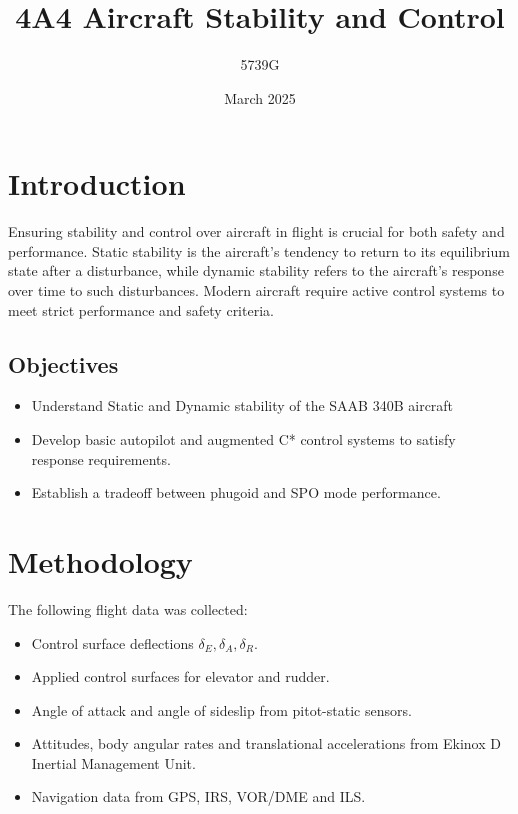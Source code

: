 \documentclass{article}
\begin{document}
\title{4A4 Aircraft Stability and Control}
\author{5739G}
\date{March 2025}
\maketitle

\section{Introduction}

Ensuring stability and control over aircraft in flight is crucial for both safety and performance.
Static stability is the aircraft's tendency to return to its equilibrium state after a disturbance, while dynamic stability refers to the aircraft's response over time to such disturbances.
Modern aircraft require active control systems to meet strict performance and safety criteria.

\subsection{Objectives}

\begin{itemize}
    \item Understand Static and Dynamic stability of the SAAB 340B aircraft
    \item Develop basic autopilot and augmented C* control systems to satisfy response requirements.
    \item Establish a tradeoff between phugoid and SPO mode performance.
\end{itemize}

\section{Methodology}

The following flight data was collected:
\begin{itemize}
    \item Control surface deflections $\delta_E, \delta_A, \delta_R$.
    \item Applied control surfaces for elevator and rudder.
    \item Angle of attack and angle of sideslip from pitot-static sensors.
    \item Attitudes, body angular rates and translational accelerations from Ekinox D Inertial Management Unit.
    \item Navigation data from GPS, IRS, VOR/DME and ILS.
\end{itemize}
\end{document}
